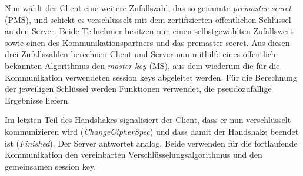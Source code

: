 Nun wählt der Client eine weitere Zufallszahl, das so genannte
\emph{premaster secret} (PMS)\indexTLSPreMasterSecret, und schickt es
verschlüsselt mit dem zertifizierten öffentlichen Schlüssel an den
Server. Beide Teilnehmer besitzen nun einen selbstgewählten Zufallswert
sowie einen des Kommunikationspartners und das premaster secret. Aus
diesen drei Zufallszahlen berechnen Client und Server nun mithilfe eines
öffentlich bekannten Algorithmus den \emph{master key}
(MS)\indexTLSMasterKey, aus dem wiederum die für die Kommunikation
verwendeten session keys abgeleitet werden.  Für die Berechnung der
jeweiligen Schlüssel werden Funktionen verwendet, die pseudozufällige
Ergebnisse liefern.

Im letzten Teil des Handshakes signalisiert der Client, dass er nun
verschlüsselt kommunizieren wird (\emph{ChangeCipherSpec}) und dass
damit der Handshake beendet ist (\emph{Finished}). Der Server antwortet
analog. Beide verwenden für die fortlaufende Kommunikation den
vereinbarten Verschlüsselungsalgorithmus und den gemeinsamen session
key.
